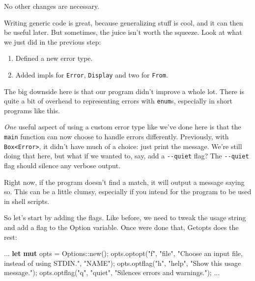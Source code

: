 \documentclass[a4paper,]{book}
\newenvironment{Shaded}{\begin{snugshade}}{\end{snugshade}}
\newcommand{\KeywordTok}[1]{\textcolor[rgb]{0.13,0.29,0.53}{\textbf{{#1}}}}
\newcommand{\StringTok}[1]{\textcolor[rgb]{0.31,0.60,0.02}{{#1}}}
\newcommand{\NormalTok}[1]{{#1}}
\providecommand{\tightlist}{%
  \setlength{\itemsep}{0pt}\setlength{\parskip}{0pt}}
\begin{document}
No other changes are necessary.


Writing generic code is great, because generalizing stuff is cool, and
it can then be useful later. But sometimes, the juice isn't worth the
squeeze. Look at what we just did in the previous step:

\begin{enumerate}
\def\labelenumi{\arabic{enumi}.}
\tightlist
\item
  Defined a new error type.
\item
  Added impls for \texttt{Error}, \texttt{Display} and two for
  \texttt{From}.
\end{enumerate}

The big downside here is that our program didn't improve a whole lot.
There is quite a bit of overhead to representing errors with
\texttt{enum}s, especially in short programs like this.

\emph{One} useful aspect of using a custom error type like we've done
here is that the \texttt{main} function can now choose to handle errors
differently. Previously, with
\texttt{Box\textless{}Error\textgreater{}}, it didn't have much of a
choice: just print the message. We're still doing that here, but what if
we wanted to, say, add a \texttt{-\/-quiet} flag? The \texttt{-\/-quiet}
flag should silence any verbose output.

Right now, if the program doesn't find a match, it will output a message
saying so. This can be a little clumsy, especially if you intend for the
program to be used in shell scripts.

So let's start by adding the flags. Like before, we need to tweak the
usage string and add a flag to the Option variable. Once were done that,
Getopts does the rest:

\begin{Shaded}
\begin{Highlighting}[]
\NormalTok{...}
\KeywordTok{let} \KeywordTok{mut} \NormalTok{opts = Options::new();}
\NormalTok{opts.optopt(}\StringTok{"f"}\NormalTok{, }\StringTok{"file"}\NormalTok{, }\StringTok{"Choose an input file, instead of using STDIN."}\NormalTok{, }\StringTok{"NAME"}\NormalTok{);}
\NormalTok{opts.optflag(}\StringTok{"h"}\NormalTok{, }\StringTok{"help"}\NormalTok{, }\StringTok{"Show this usage message."}\NormalTok{);}
\NormalTok{opts.optflag(}\StringTok{"q"}\NormalTok{, }\StringTok{"quiet"}\NormalTok{, }\StringTok{"Silences errors and warnings."}\NormalTok{);}
\NormalTok{...}
\end{Highlighting}
\end{Shaded}
\end{document}
